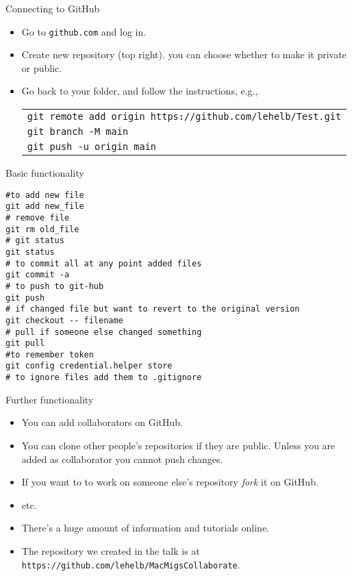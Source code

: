 \documentclass{beamer}
\begin{document}
 \begin{frame}{Connecting to GitHub}
   \begin{itemize}
   \item Go to \texttt{github.com} and log in.
   \item Create new repository (top right). you can choose whether to make it private or public.
   \item Go back to your folder, and follow the instructions, e.g.,\\
     \begin{center}
       \begin{tabular}{l}
       \texttt{git remote add origin https://github.com/lehelb/Test.git}\\
       \texttt{git branch -M main}\\
       \texttt{git push -u origin main}         
       \end{tabular}
     \end{center}
   \end{itemize}
 \end{frame}

 \begin{frame}[fragile]{Basic functionality}
\begin{verbatim}
#to add new file
git add new_file
# remove file
git rm old_file
# git status
git status
# to commit all at any point added files
git commit -a
# to push to git-hub
git push
# if changed file but want to revert to the original version
git checkout -- filename
# pull if someone else changed something
git pull
#to remember token
git config credential.helper store
# to ignore files add them to .gitignore
\end{verbatim}
 \end{frame}

 \begin{frame}{Further functionality}
   \begin{itemize}
   \item You can add collaborators on GitHub. 
   \item You can clone other people's repositories if they are public. Unless you are added as collaborator you cannot push changes.
\item If you want to to work on someone else's repository {\em fork} it on GitHub.
\item etc.
\item There's a huge amount of information and tutorials online.
\item The repository we created in the talk is at \texttt{https://github.com/lehelb/MacMigsCollaborate}.
   \end{itemize}
 \end{frame}
\end{document}
